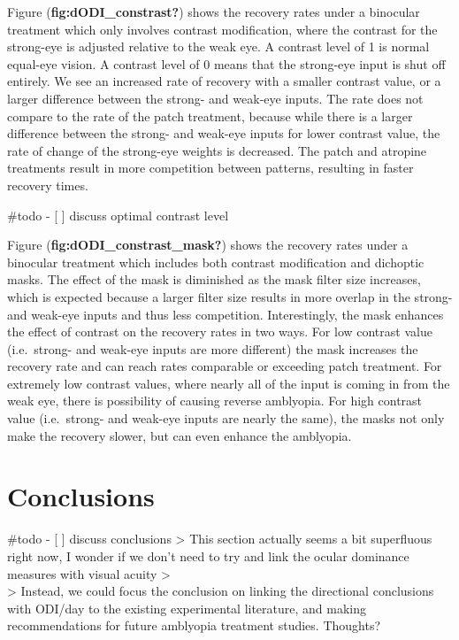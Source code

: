 \documentclass[
  letterpaper,
  DIV=11,
  numbers=noendperiod]{scrreprt}
\begin{document}
Figure (\textbf{fig:dODI\_constrast?}) shows the recovery rates under a
binocular treatment which only involves contrast modification, where the
contrast for the strong-eye is adjusted relative to the weak eye. A
contrast level of 1 is normal equal-eye vision. A contrast level of 0
means that the strong-eye input is shut off entirely. We see an
increased rate of recovery with a smaller contrast value, or a larger
difference between the strong- and weak-eye inputs. The rate does not
compare to the rate of the patch treatment, because while there is a
larger difference between the strong- and weak-eye inputs for lower
contrast value, the rate of change of the strong-eye weights is
decreased. The patch and atropine treatments result in more competition
between patterns, resulting in faster recovery times.

\#todo - {[} {]} discuss optimal contrast level

Figure (\textbf{fig:dODI\_constrast\_mask?}) shows the recovery rates
under a binocular treatment which includes both contrast modification
and dichoptic masks. The effect of the mask is diminished as the mask
filter size increases, which is expected because a larger filter size
results in more overlap in the strong- and weak-eye inputs and thus less
competition. Interestingly, the mask enhances the effect of contrast on
the recovery rates in two ways. For low contrast value (i.e.~strong- and
weak-eye inputs are more different) the mask increases the recovery rate
and can reach rates comparable or exceeding patch treatment. For
extremely low contrast values, where nearly all of the input is coming
in from the weak eye, there is possibility of causing reverse amblyopia.
For high contrast value (i.e.~strong- and weak-eye inputs are nearly the
same), the masks not only make the recovery slower, but can even enhance
the amblyopia.

\part{Conclusions}

\#todo - {[} {]} discuss conclusions \textgreater{} This section
actually seems a bit superfluous right now, I wonder if we don't need to
try and link the ocular dominance measures with visual acuity
\textgreater{}\\
\textgreater{} Instead, we could focus the conclusion on linking the
directional conclusions with ODI/day to the existing experimental
literature, and making recommendations for future amblyopia treatment
studies. Thoughts?
\end{document}
